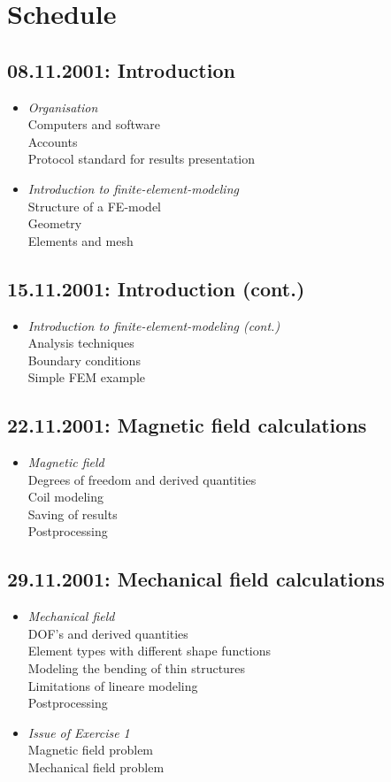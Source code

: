 \section{Schedule}
%
\subsection*{08.11.2001: Introduction}
%
\begin{itemize}
\item {\em Organisation}\\
Computers and software\\
Accounts\\
Protocol standard for results presentation 
\item {\em Introduction to finite-element-modeling}\\
Structure of a FE-model\\
Geometry\\
Elements and mesh
\end{itemize}
%
\subsection*{15.11.2001: Introduction (cont.)}
%
\begin{itemize}
\item {\em Introduction to finite-element-modeling (cont.)}\\
Analysis techniques\\
Boundary conditions\\
Simple FEM example
\end{itemize}
%
\newslide
%
\subsection*{22.11.2001: Magnetic field calculations}
%
\begin{itemize}
\item{\em Magnetic field}\\
Degrees of freedom and derived quantities\\
Coil modeling\\
Saving of results\\
Postprocessing
\end{itemize}
%
\subsection*{29.11.2001: Mechanical field calculations}
%
\begin{itemize}
\item{\em Mechanical field}\\
DOF's and derived quantities\\
Element types with different shape functions\\
Modeling the bending of thin structures\\
Limitations of lineare modeling\\
Postprocessing
\item{\em Issue of Exercise 1}\\
Magnetic field problem\\
Mechanical field problem
\end{itemize}
%
\newslide
%
